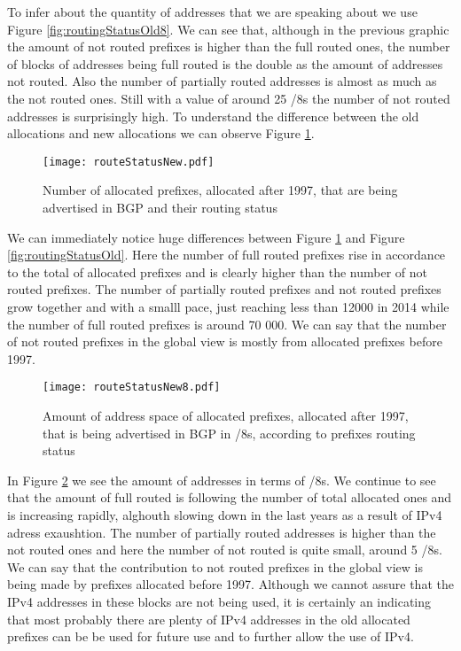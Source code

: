 \documentclass[11pt,a4paper]{scrreprt}
\begin{document}
To infer about the quantity of addresses that we are speaking about we use Figure \ref{fig:routingStatusOld8}. We can see that, although in the previous graphic the amount of not routed prefixes is higher than the full routed ones, the number of blocks of addresses being full routed is the double as the amount of addresses not routed. Also the number of partially routed addresses is almost as much as the not routed ones. Still with a value of around 25 /8s the number of not routed addresses is surprisingly high. To understand the difference between the old allocations and new allocations we can observe Figure \ref{fig:routingStatusNew}.

\begin{figure}[!h]
\centering
\texttt{[image: routeStatusNew.pdf]}
\caption{Number of allocated prefixes, allocated after 1997, that are being advertised in BGP and their routing status}
\label{fig:routingStatusNew}
\end{figure}

We can immediately notice huge differences between Figure \ref{fig:routingStatusNew} and Figure \ref{fig:routingStatusOld}. Here the number of full routed prefixes rise in accordance to the total of allocated prefixes and is clearly higher than the number of not routed prefixes. The number of partially routed prefixes and not routed prefixes grow together and with a smalll pace, just reaching less than 12000 in 2014 while the number of full routed prefixes is around 70 000. We can say that the number of not routed prefixes in the global view is mostly from allocated prefixes before 1997.


\begin{figure}[!h]
\centering
\texttt{[image: routeStatusNew8.pdf]}
\caption{Amount of address space of allocated prefixes, allocated after 1997, that is being advertised in BGP in /8s, according to prefixes routing status}
\label{fig:routingStatusNew8}
\end{figure}

In Figure \ref{fig:routingStatusNew8} we see the amount of addresses in terms of /8s. We continue to see that the amount of full routed is following the number of total allocated ones and is increasing rapidly, alghouth slowing down in the last years as a result of IPv4 adress exaushtion. The number of partially routed addresses is higher than the not routed ones and here the number of not routed is quite small, around 5 /8s. We can say that the contribution to not routed prefixes in the global view is being made by prefixes allocated before 1997. Although we cannot assure that the IPv4 addresses in these blocks are not being used, it is certainly an indicating that most probably there are plenty of IPv4 addresses in the old allocated prefixes can be be used for future use and to further allow the use of IPv4.
\end{document}
